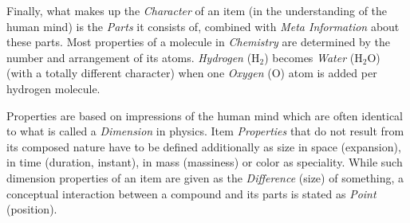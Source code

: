 Finally, what makes up the \emph{Character} of an item (in the understanding of the
human mind) is the \emph{Parts} it consists of, combined with \emph{Meta Information}
about these parts. Most properties of a molecule in \emph{Chemistry} are determined
by the number and arrangement of its atoms. \emph{Hydrogen} (H$_{2}$) becomes
\emph{Water} (H$_{2}$O) (with a totally different character) when one \emph{Oxygen}
(O) atom is added per hydrogen molecule.

Properties are based on impressions of the human mind which are often identical to
what is called a \emph{Dimension} in physics. Item \emph{Properties} that do not
result from its composed nature have to be defined additionally as size in space
(expansion), in time (duration, instant), in mass (massiness) or color as
speciality. While such dimension properties of an item are given as the
\emph{Difference} (size) of something, a conceptual interaction between a compound
and its parts is stated as \emph{Point} (position).
